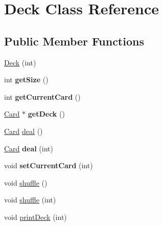 \hypertarget{class_deck}{\section{Deck Class Reference}
\label{class_deck}
}
\subsection*{Public Member Functions}
\begin{DoxyCompactItemize}
\item 
\hyperlink{class_deck_a5487610d44f13d27ef54c930e2bdadf9}{Deck} (int)
\item 
\hypertarget{class_deck_a6e84b60abbfc3ef41ff8224e3ead95b0}{int {\bfseries get\-Size} ()}\label{class_deck_a6e84b60abbfc3ef41ff8224e3ead95b0}

\item 
\hypertarget{class_deck_a15f1bacae09dff1f77d9c76c27b28555}{int {\bfseries get\-Current\-Card} ()}\label{class_deck_a15f1bacae09dff1f77d9c76c27b28555}

\item 
\hypertarget{class_deck_a37eb23228a26842be5d772ea544fcd8d}{\hyperlink{class_card}{Card} $\ast$ {\bfseries get\-Deck} ()}\label{class_deck_a37eb23228a26842be5d772ea544fcd8d}

\item 
\hyperlink{class_card}{Card} \hyperlink{class_deck_a16604aabf7fc56dd44a72c4e862758cf}{deal} ()
\item 
\hypertarget{class_deck_aa44bf5c7e46793f4743b9b47e9a13a14}{\hyperlink{class_card}{Card} {\bfseries deal} (int)}\label{class_deck_aa44bf5c7e46793f4743b9b47e9a13a14}

\item 
\hypertarget{class_deck_a8a27a8d5e66ab11340ce996445a54ec6}{void {\bfseries set\-Current\-Card} (int)}\label{class_deck_a8a27a8d5e66ab11340ce996445a54ec6}

\item 
void \hyperlink{class_deck_ae5a1e52ab00ae5924f2bc6b730dba3eb}{shuffle} ()
\item 
void \hyperlink{class_deck_a257dea63965473552803e20b222c0490}{shuffle} (int)
\item 
void \hyperlink{class_deck_a76b0a852aab3fb674a8f25f01bcae876}{print\-Deck} (int)
\end{DoxyCompactItemize}


